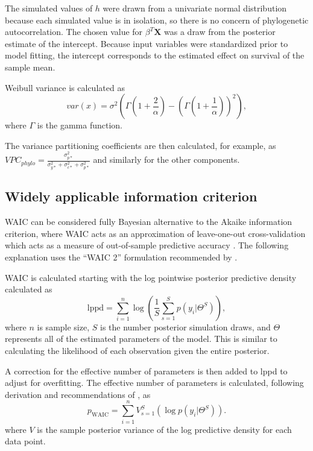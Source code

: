 The simulated values of \(h\) were drawn from a univariate normal distribution because each simulated value is in isolation, so there is no concern of phylogenetic autocorrelation. The chosen value for \(\beta^{T} \mathbf{X}\) was a draw from the posterior estimate of the intercept. Because input variables were standardized prior to model fitting, the intercept corresponds to the estimated effect on survival of the sample mean.

Weibull variance is calculated as
\begin{equation}
  var(x) = \sigma^{2}\left(\Gamma\left(1 + \frac{2}{\alpha}\right) - \left(\Gamma\left(1 + \frac{1}{\alpha}\right)\right)^{2}\right),
  \label{eq:wei_var} \end{equation}
where \(\Gamma\) is the gamma function. 

The variance partitioning coefficients are then calculated, for example, as \(VPC_{phylo} = \frac{\sigma_{p*}^{2}}{\sigma_{y*}^{2} + \sigma_{c*}^{2} + \sigma_{p*}^{2}}\) and similarly for the other components.



\subsection{Widely applicable information criterion}
WAIC can be considered fully Bayesian alternative to the Akaike information criterion, where WAIC acts as an approximation of leave-one-out cross-validation which acts as a measure of out-of-sample predictive accuracy \cite{Gelman2013d}. The following explanation uses the ``WAIC 2'' formulation recommended by \cite{Gelman2013d}. 

WAIC is calculated starting with the log pointwise posterior predictive density calculated as
\begin{equation}
  \mathrm{lppd} = \sum_{i = 1}^{n} \log \left(\frac{1}{S} \sum_{s = 1}^{S} p(y_{i}|\Theta^{S})\right),
  \label{eq:lppd}
\end{equation}
where \(n\) is sample size, \(S\) is the number posterior simulation draws, and \(\Theta\) represents all of the estimated parameters of the model. This is similar to calculating the likelihood of each observation given the entire posterior.

A correction for the effective number of parameters is then added to lppd to adjust for overfitting. The effective number of parameters is calculated, following derivation and recommendations of \cite{Gelman2013d}, as
\begin{equation}
  p_{\mathrm{WAIC}} = \sum_{i = 1}^{n} V_{s = 1}^{S} (\log p(y_{i}|\Theta^{S})).
  \label{eq:pwaic}
\end{equation}
where \(V\) is the sample posterior variance of the log predictive density for each data point.

